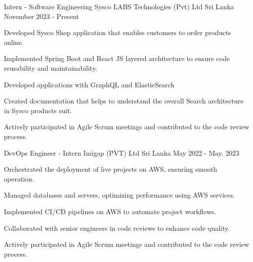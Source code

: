 

\begin{cventries}

  \cventry
  {Intern - Software Engineering} %
  {Sysco LABS Technologies (Pvt) Ltd} %
  {Sri Lanka} %
  {November 2023 - Present} %
  {
    \begin{cvitems} %
      \item {Developed Sysco Shop application that enables customers to order products online.}
      \item {Implemented Spring Boot and React JS layered architecture to ensure code reusability and maintainability.}
      \item {Developed applications with GraphQL and ElasticSearch}
      \item {Created documentation that helps to understand the overall Search architecture in Sysco products suit.}
      \item {Actively participated in Agile Scrum meetings and contributed to the code review process.}
    \end{cvitems}
  }

  \cventry
  {DevOps Engineer - Intern} %
  {Imigap (PVT) Ltd} %
  {Sri Lanka} %
  {May 2022 - May. 2023} %
  {
    \begin{cvitems} %
      \item {Orchestrated the deployment of live projects on AWS, ensuring smooth operation.}
      \item {Managed databases and servers, optimizing performance using AWS services.}
      \item {Implemented CI/CD pipelines on AWS to automate project workflows.}
      \item {Collaborated with senior engineers in code reviews to enhance code quality.}
      \item {Actively participated in Agile Scrum meetings and contributed to the code review process.}
    \end{cvitems}
  }


\end{cventries}
